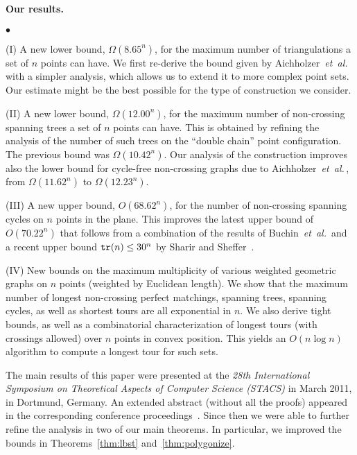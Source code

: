 \documentclass[11pt]{article}
\def\etal{{\it et~al.}\,}
\newcommand{\squishlist}{
 \begin{list}{$\bullet$}
  { \setlength{\itemsep}{0pt}
     \setlength{\parsep}{3pt}
     \setlength{\topsep}{3pt}
     \setlength{\partopsep}{0pt}
     \setlength{\leftmargin}{1.5em}
     \setlength{\labelwidth}{1em}
     \setlength{\labelsep}{0.5em} } }
\newcommand{\squishend}{
  \end{list} }
\def\tr{{\tt tr}}
\begin{document}
\paragraph{Our results.} 

\squishlist
\item[(I)] A new lower bound, $\Omega(8.65^n)$, for the maximum number of
triangulations a set of $n$ points can have.
We first re-derive the bound given by Aichholzer~\etal~\cite{AHV+06}
with a simpler analysis, which allows us to extend it to
more complex point sets. Our estimate might be the best possible
for the type of construction we consider.

\item[(II)] A new lower bound, $\Omega(12.00^n)$, for the maximum number of
non-crossing spanning trees a set of $n$ points can have.
This is obtained by refining the analysis of the number of such trees
on the ``double chain'' point configuration. The previous bound was
$\Omega(10.42^n)$. Our analysis of the construction improves
also the lower bound for cycle-free non-crossing graphs
due to Aichholzer~\etal\cite{AHV+06}, from $\Omega(11{.}62^n)$ to $\Omega(12{.}23^n)$.

\item[(III)] A new upper bound, $O(68.62^n)$, for the number of
non-crossing spanning cycles on $n$ points in the plane. This
improves the latest upper bound of $O(70.22^n)$ that follows from a
combination of the results of Buchin~\etal\cite{BKK+07} and a
recent upper bound $\tr(n)\leq 30^n$ by Sharir and Sheffer~\cite{SS10}.

\item[(IV)] New bounds on the maximum multiplicity of various weighted
geometric graphs on $n$ points (weighted by Euclidean length).
We show that the maximum number of longest non-crossing perfect matchings,
spanning trees, spanning cycles, as well as shortest tours are all exponential in $n$.
We also derive tight bounds, as well as a combinatorial characterization of
longest tours (with crossings allowed) over $n$ points in convex position.
This yields an $O(n \log n)$ algorithm to compute a longest tour for such sets.
\squishend

The main results of this paper were presented at the \emph{28th
  International Symposium on Theoretical Aspects of Computer Science
  (STACS)} in March 2011, in Dortmund, Germany.
An extended abstract (without all the proofs) appeared in the corresponding
conference proceedings~\cite{DSST11}. Since then we were able to further
refine the analysis in two of our main theorems.
In particular, we improved the bounds in Theorems~\ref{thm:lbst}
and~\ref{thm:polygonize}.
\end{document}
